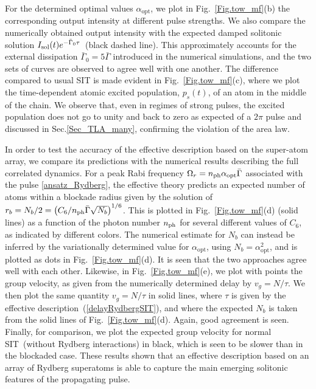 \documentclass[pra,twocolumn,showpacs,preprintnumbers,amsmath,amssymb]{revtex4-1}
\begin{document}
For the determined optimal values  $\alpha_{\textrm{opt}}$, we plot in Fig.~\ref{Fig.tow_mf}(b)  the corresponding output intensity at different pulse strengths. We also compare the numerically obtained output intensity with the expected damped solitonic solution $I_{\rm sol}(t)e^{-\bar \Gamma_0 \tau}$~(black dashed line). This approximately accounts for the external dissipation $\bar{\Gamma}_0=5\bar{\Gamma}$ introduced in the numerical simulations, and the two sets of curves are observed to agree well with one another. 
The difference compared to usual SIT is made evident in Fig.~\ref{Fig.tow_mf}(c), where we plot the time-dependent atomic excited population, $p_s(t)$, of an atom in the middle of the chain. We observe that, even in regimes of strong pulses, the excited population does not go to unity and back to zero as expected of a $2\pi$ pulse and discussed in Sec.\ref{Sec_TLA_many}, confirming the violation of the area law. 

In order to test the accuracy of the effective description based on the super-atom array, we compare its predictions with the numerical results describing the full correlated dynamics.
For a peak Rabi frequency $\Omega_r=n_{\rm ph}\alpha_{\textrm{opt}}\bar\Gamma$ associated with the pulse \eqref{ansatz_Rydberg}, the effective theory predicts an expected number of atoms within a blockade radius given by the solution of $r_b=N_b/2=\left(C_6/n_{\rm ph}\bar{\Gamma}\sqrt{N_b}\right)^{1/6}$. This is plotted  in Fig.~\ref{Fig.tow_mf}(d) (solid lines) as a function of the photon number $n_{\rm ph}$ for several different values of $C_6$, as indicated by different colors. The numerical estimate for $N_b$ can instead be inferred by 
the variationally determined value for $\alpha_{\textrm{opt}}$, using $N_b=\alpha_{\textrm{opt}}^2$, and is plotted as dots in  Fig.~\ref{Fig.tow_mf}(d).
 It is seen that the two approaches agree well with each other. Likewise, in Fig.~\ref{Fig.tow_mf}(e), we plot with points the group velocity, as given from the numerically determined delay by $v_g=N/\tau$. We then plot the same quantity $v_g=N/\tau$ in solid lines, where $\tau$ is given by the effective description~(\ref{delayRydbergSIT}), and where the expected $N_b$ is taken from the solid lines of Fig.~\ref{Fig.tow_mf}(d). Again, good agreement is seen. Finally, for comparison, we plot the expected group velocity for normal SIT~(without Rydberg interactions) in black, which is seen to be slower than in the blockaded case. These results shown that an effective description based on an array of Rydberg superatoms is able to capture the main emerging solitonic features of the propagating pulse.
\end{document}
